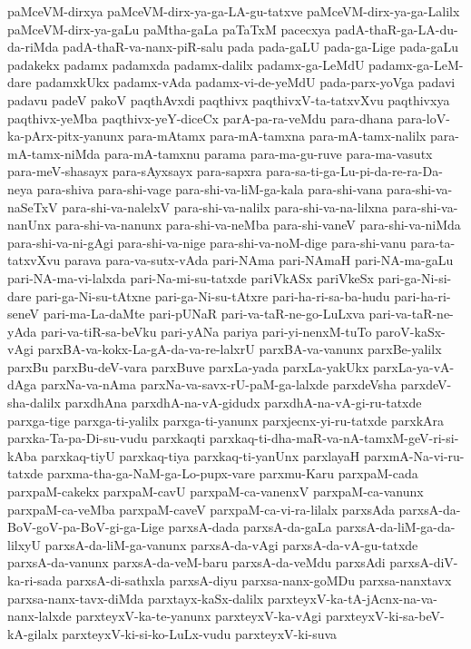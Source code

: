 {paMceVM-dirxya
paMceVM-dirx-ya-ga-LA-gu-tatxve
paMceVM-dirx-ya-ga-Lalilx
paMceVM-dirx-ya-gaLu
paMtha-gaLa
paTaTxM
pacecxya
padA-thaR-ga-LA-du-da-riMda
padA-thaR-va-nanx-piR-salu
pada
pada-gaLU
pada-ga-Lige
pada-gaLu
padakekx
padamx
padamxda
padamx-dalilx
padamx-ga-LeMdU
padamx-ga-LeM-dare
padamxkUkx
padamx-vAda
padamx-vi-de-yeMdU
pada-parx-yoVga
padavi
padavu
padeV
pakoV
paqthAvxdi
paqthivx
paqthivxV-ta-tatxvXvu
paqthivxya
paqthivx-yeMba
paqthivx-yeY-diceCx
parA-pa-ra-veMdu
para-dhana
para-loV-ka-pArx-pitx-yanunx
para-mAtamx
para-mA-tamxna
para-mA-tamx-nalilx
para-mA-tamx-niMda
para-mA-tamxnu
parama
para-ma-gu-ruve
para-ma-vasutx
para-meV-shasayx
para-sAyxsayx
para-sapxra
para-sa-ti-ga-Lu-pi-da-re-ra-Da-neya
para-shiva
para-shi-vage
para-shi-va-liM-ga-kala
para-shi-vana
para-shi-va-naSeTxV
para-shi-va-nalelxV
para-shi-va-nalilx
para-shi-va-na-lilxna
para-shi-va-nanUnx
para-shi-va-nanunx
para-shi-va-neMba
para-shi-vaneV
para-shi-va-niMda
para-shi-va-ni-gAgi
para-shi-va-nige
para-shi-va-noM-dige
para-shi-vanu
para-ta-tatxvXvu
parava
para-va-sutx-vAda
pari-NAma
pari-NAmaH
pari-NA-ma-gaLu
pari-NA-ma-vi-lalxda
pari-Na-mi-su-tatxde
pariVkASx
pariVkeSx
pari-ga-Ni-si-dare
pari-ga-Ni-su-tAtxne
pari-ga-Ni-su-tAtxre
pari-ha-ri-sa-ba-hudu
pari-ha-ri-seneV
pari-ma-La-daMte
pari-pUNaR
pari-va-taR-ne-go-LuLxva
pari-va-taR-ne-yAda
pari-va-tiR-sa-beVku
pari-yANa
pariya
pari-yi-nenxM-tuTo
paroV-kaSx-vAgi
parxBA-va-kokx-La-gA-da-va-re-lalxrU
parxBA-va-vanunx
parxBe-yalilx
parxBu
parxBu-deV-vara
parxBuve
parxLa-yada
parxLa-yakUkx
parxLa-ya-vA-dAga
parxNa-va-nAma
parxNa-va-savx-rU-paM-ga-lalxde
parxdeVsha
parxdeV-sha-dalilx
parxdhAna
parxdhA-na-vA-gidudx
parxdhA-na-vA-gi-ru-tatxde
parxga-tige
parxga-ti-yalilx
parxga-ti-yanunx
parxjecnx-yi-ru-tatxde
parxkAra
parxka-Ta-pa-Di-su-vudu
parxkaqti
parxkaq-ti-dha-maR-va-nA-tamxM-geV-ri-si-kAba
parxkaq-tiyU
parxkaq-tiya
parxkaq-ti-yanUnx
parxlayaH
parxmA-Na-vi-ru-tatxde
parxma-tha-ga-NaM-ga-Lo-pupx-vare
parxmu-Karu
parxpaM-cada
parxpaM-cakekx
parxpaM-cavU
parxpaM-ca-vanenxV
parxpaM-ca-vanunx
parxpaM-ca-veMba
parxpaM-caveV
parxpaM-ca-vi-ra-lilalx
parxsAda
parxsA-da-BoV-goV-pa-BoV-gi-ga-Lige
parxsA-dada
parxsA-da-gaLa
parxsA-da-liM-ga-da-lilxyU
parxsA-da-liM-ga-vanunx
parxsA-da-vAgi
parxsA-da-vA-gu-tatxde
parxsA-da-vanunx
parxsA-da-veM-baru
parxsA-da-veMdu
parxsAdi
parxsA-diV-ka-ri-sada
parxsA-di-sathxla
parxsA-diyu
parxsa-nanx-goMDu
parxsa-nanxtavx
parxsa-nanx-tavx-diMda
parxtayx-kaSx-dalilx
parxteyxV-ka-tA-jAcnx-na-va-nanx-lalxde
parxteyxV-ka-te-yanunx
parxteyxV-ka-vAgi
parxteyxV-ki-sa-beV-kA-gilalx
parxteyxV-ki-si-ko-LuLx-vudu
parxteyxV-ki-suva
}
